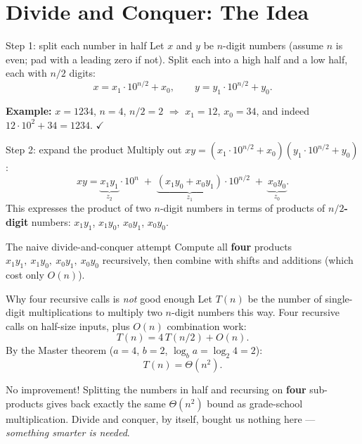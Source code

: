 \documentclass[11pt,aspectratio=169]{beamer}
\begin{document}
\section{Divide and Conquer: The Idea}

\begin{frame}{Step 1: split each number in half}
  Let $x$ and $y$ be $n$-digit numbers (assume $n$ is even; pad with a leading zero if not).
  Split each into a high half and a low half, each with $n/2$ digits:
  \[
    x = x_1 \cdot 10^{n/2} + x_0, \qquad y = y_1 \cdot 10^{n/2} + y_0.
  \]
  \begin{center}
  \end{center}
  \textbf{Example:} $x = 1234$, $n = 4$, $n/2 = 2$ $\Rightarrow$ $x_1 = 12$, $x_0 = 34$, and
  indeed $12 \cdot 10^2 + 34 = 1234$. $\checkmark$
\end{frame}

\begin{frame}{Step 2: expand the product}
  Multiply out $xy = (x_1 \cdot 10^{n/2} + x_0)(y_1 \cdot 10^{n/2} + y_0)$:
  \[
    xy = \underbrace{x_1 y_1}_{z_2} \cdot 10^{n} \;+\; \underbrace{(x_1y_0 + x_0y_1)}_{z_1}
    \cdot 10^{n/2} \;+\; \underbrace{x_0 y_0}_{z_0}.
  \]
  This expresses the product of two $n$-digit numbers in terms of products of
  \textbf{$n/2$-digit} numbers: $x_1y_1$, $x_1y_0$, $x_0y_1$, $x_0y_0$.
  \vspace{1em}
  \begin{alertblock}{The naive divide-and-conquer attempt}
    Compute all \textbf{four} products $x_1y_1,\ x_1y_0,\ x_0y_1,\ x_0y_0$ recursively, then
    combine with shifts and additions (which cost only $O(n)$).
  \end{alertblock}
\end{frame}

\begin{frame}{Why four recursive calls is \emph{not} good enough}
  Let $T(n)$ be the number of single-digit multiplications to multiply two $n$-digit
  numbers this way. Four recursive calls on half-size inputs, plus $O(n)$ combination work:
  \[
    T(n) = 4\, T(n/2) + O(n).
  \]
  By the Master theorem ($a = 4$, $b = 2$, $\log_b a = \log_2 4 = 2$):
  \[
    T(n) = \Theta(n^2).
  \]
  \begin{alertblock}{No improvement!}
    Splitting the numbers in half and recursing on \textbf{four} sub-products gives back
    exactly the same $\Theta(n^2)$ bound as grade-school multiplication. Divide and conquer,
    by itself, bought us nothing here --- \emph{something smarter is needed}.
  \end{alertblock}
\end{frame}
\end{document}
